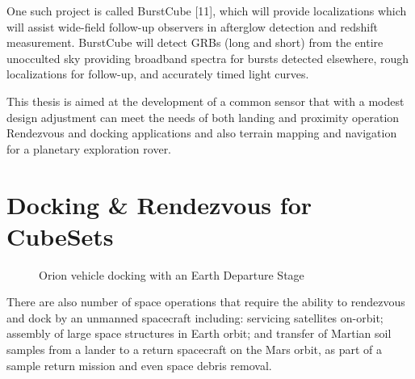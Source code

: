 One such project is called BurstCube [11], which will provide localizations which will assist wide-field follow-up observers in afterglow detection and redshift measurement.
BurstCube will detect GRBs (long and short) from the entire unocculted sky providing broadband spectra for bursts detected elsewhere, rough localizations for follow-up, and accurately timed light curves.

This thesis is aimed at the development of a common sensor
that with a modest design adjustment can meet the needs of both landing and proximity operation Rendezvous and docking applications and also terrain mapping and navigation for a planetary exploration rover.






\section{Docking \& Rendezvous for CubeSets}

\begin{minipage}[H]{0.45\linewidth}
\begin{figure}[H]

\caption{Orion vehicle docking with an Earth Departure Stage }
\label{fig:docking}
\end{figure}
\end{minipage}
\hfill
\begin{minipage}[h]{0.48\linewidth}

There are also number of space operations that require the ability to rendezvous and dock by an unmanned spacecraft including:
servicing satellites on-orbit; assembly of large space structures in Earth orbit; and transfer of Martian soil samples from a lander to a return spacecraft on the Mars orbit, as part of a sample return mission and even space debris removal.
\end{minipage}
\vspace{1cm}


